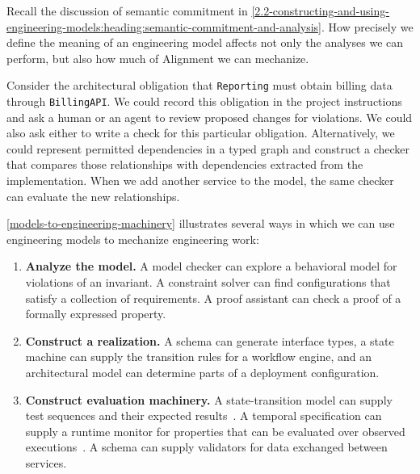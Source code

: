 Recall the discussion of semantic commitment in \autoref{2.2-constructing-and-using-engineering-models:heading:semantic-commitment-and-analysis}. How precisely we define the meaning of an engineering model affects not only the analyses we can perform, but also how much of Alignment we can mechanize.


Consider the architectural obligation that \texttt{Reporting} must obtain billing data through \texttt{BillingAPI}. We could record this obligation in the project instructions and ask a human or an agent to review proposed changes for violations. We could also ask either to write a check for this particular obligation. Alternatively, we could represent permitted dependencies in a typed graph and construct a checker that compares those relationships with dependencies extracted from the implementation. When we add another service to the model, the same checker can evaluate the new relationships.

\autoref{models-to-engineering-machinery} illustrates several ways in which we can use engineering models to mechanize engineering work:

\begin{enumerate}
\item \textbf{Analyze the model.} A model checker can explore a behavioral model for violations of an invariant. A constraint solver can find configurations that satisfy a collection of requirements. A proof assistant can check a proof of a formally expressed property.
\item \textbf{Construct a realization.} A schema can generate interface types, a state machine can supply the transition rules for a workflow engine, and an architectural model can determine parts of a deployment configuration.
\item \textbf{Construct evaluation machinery.} A state-transition model can supply test sequences and their expected results~\citep{utting2012taxonomy}. A temporal specification can supply a runtime monitor for properties that can be evaluated over observed executions~\citep{bartocci2018runtime}. A schema can supply validators for data exchanged between services.
\end{enumerate}

